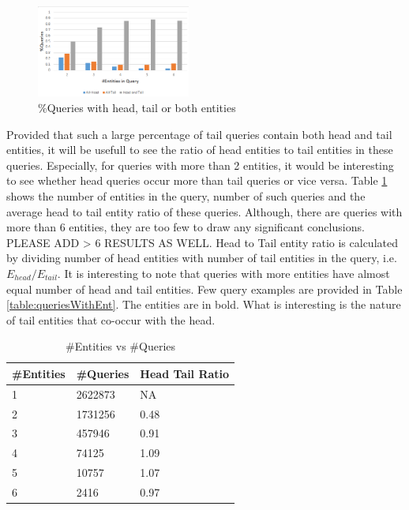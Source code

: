 \begin{figure}[t]
\label{img:headTailEntPercent}
\caption{\%Queries with head, tail or both entities}
  \centering
    \includegraphics[width = 0.45\textwidth]{images/entity-head-tail-count.png}
\end{figure}
 
Provided that such a large percentage of tail queries contain both head and tail entities, it 
will be usefull to see the ratio of head entities to tail entities in these queries. Especially, 
for queries with more than 2 entities, it would be interesting to see whether head queries occur more
than tail queries or vice versa. Table \ref{table:entDist} shows the number of entities in the query, 
number of such queries and the average head to tail entity ratio of these queries.
Although, there are queries with more than 6 entities, they are too few to draw any significant 
conclusions. PLEASE ADD > 6 RESULTS AS WELL. 
Head to Tail entity ratio is calculated by dividing number of head entities with number of 
tail entities in the query, i.e. $E_{head}/E_{tail}$. It is interesting to note that queries with
more entities have almost equal number of head and tail entities. Few query examples are provided in
Table \ref{table:queriesWithEnt}. The entities are in bold. What is interesting is the nature of tail
entities that co-occur with the head. 

\begin{table}
\caption{\#Entities vs \#Queries}
\label{table:entDist}
\centering
\begin{tabular}{|l|l|l|}
\hline
\#Entities & \#Queries & Head Tail Ratio \\ \hline
1 & 2622873 & NA \\ \hline
2 & 1731256 & 0.48 \\ \hline
3 & 457946  & 0.91 \\ \hline
4 & 74125 & 1.09  \\ \hline
5 & 10757 & 1.07 \\ \hline
6 & 2416  & 0.97 \\ \hline
\end{tabular}
\end{table}

